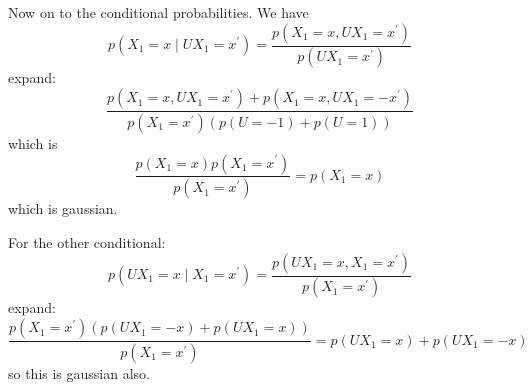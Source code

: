 \documentclass{article}
\begin{document}
\begin{itemize}
\begin{itemize}
\begin{answer}
                        Now on to the conditional probabilities. We have
                            \begin{equation*}
                                p(X_{1} = x \mid UX_{1} = x^{\prime}) = \dfrac{p(X_{1} = x, UX_{1} = x^{\prime})}{p(UX_{1} = x^{\prime})}
                            \end{equation*}
                        expand:
                            \begin{equation*}
                                \dfrac{p(X_{1} = x, UX_{1} = x^{\prime}) + p(X_{1} = x, UX_{1} = -x^{\prime})}{p(X_{1} = x^{\prime})(p(U = -1) + p(U = 1))}
                            \end{equation*}
                        which is
                            \begin{equation*}
                                \dfrac{p(X_{1} = x)p(X_{1} = x^{\prime})}{p(X_{1} = x^{\prime})} = p(X_{1} = x)
                            \end{equation*}
                        which is gaussian.

                        For the other conditional:
                            \begin{equation*}
                                p(UX_{1} = x \mid X_{1} = x^{\prime}) = \dfrac{p(UX_{1} = x, X_{1} = x^{\prime})}{p(X_{1} = x^{\prime})}
                            \end{equation*}
                        expand:
                            \begin{equation*}
                                \dfrac{p(X_{1} = x^{\prime})(p(UX_{1} = -x) + p(UX_{1} = x))}{p(X_{1} = x^{\prime})} = p(UX_{1} = x) + p(UX_{1} = -x)
                            \end{equation*}
                        so this is gaussian also.


\end{answer}
\end{itemize}
\end{itemize}
\end{document}
